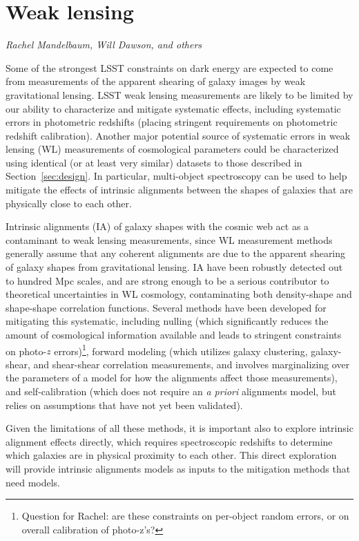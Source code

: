 \section{Weak lensing}
\label{sec:wl}
{\it Rachel Mandelbaum, Will Dawson, and others}


Some of the strongest LSST constraints on dark energy are expected to come from measurements of the apparent shearing of galaxy images by weak gravitational lensing.  LSST weak lensing measurements are likely to be limited by our ability to characterize and mitigate systematic effects, including systematic errors in photometric redshifts (placing stringent requirements on photometric redshift calibration).  Another major potential source of systematic errors in weak lensing (WL) measurements of cosmological parameters could be characterized using identical (or at least very similar) datasets to those described in Section~\ref{sec:design}.  In particular, multi-object spectroscopy can be
used to help mitigate the effects of intrinsic alignments between the shapes of galaxies that are physically close to each other.

Intrinsic alignments (IA) of galaxy shapes with the cosmic web act as a contaminant to weak lensing
measurements, since WL measurement methods generally assume that any coherent alignments are due to the apparent shearing of galaxy shapes from gravitational lensing. IA have
been robustly detected out to hundred Mpc scales, and are strong enough to be a serious contributor to theoretical uncertainties in WL cosmology, contaminating both density-shape and shape-shape correlation functions.  Several
methods have been developed for mitigating this systematic, including nulling (which significantly reduces the amount of
cosmological information available and leads to stringent constraints on photo-$z$ errors)\footnote{Question for Rachel: are these constraints on per-object random errors, or on overall calibration of photo-z's?}, forward modeling
(which utilizes galaxy clustering, galaxy-shear, and shear-shear correlation measurements, and involves
marginalizing over the parameters of a model for how the alignments affect those measurements), and self-calibration
(which does not require an {\em a priori} alignments model, but relies on assumptions that have
not yet been validated).  

Given the limitations of all these methods, it is important also to
explore intrinsic alignment effects directly, which requires spectroscopic redshifts to determine
which galaxies are in physical proximity to each other.  This direct exploration will provide
intrinsic alignments models as inputs to the mitigation methods that need models.  %

